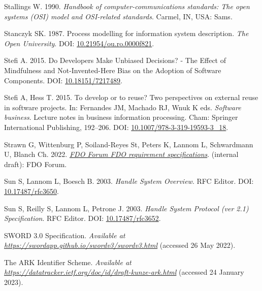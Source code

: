 \begin{CSLReferences}{1}{0}
\leavevmode{}%
Stallings W. 1990. \emph{Handbook of computer-communications standards: The open systems (OSI) model and OSI-related standards}. Carmel, IN, USA: Sams.

\leavevmode{}%
Stanczyk SK. 1987. Process modelling for information system description. \emph{The Open University}. DOI: \href{https://doi.org/10.21954/ou.ro.0000f821}{10.21954/ou.ro.0000f821}.

\leavevmode{}%
Stefi A. 2015. Do Developers Make Unbiased Decisions? - The Effect of Mindfulness and Not-Invented-Here Bias on the Adoption of Software Components. DOI: \href{https://doi.org/10.18151/7217489}{10.18151/7217489}.

\leavevmode{}%
Stefi A, Hess T. 2015. To develop or to reuse? Two perspectives on external reuse in software projects. In: Fernandes JM, Machado RJ, Wnuk K eds. \emph{Software business}. Lecture notes in business information processing. Cham: Springer International Publishing, 192--206. DOI: \href{https://doi.org/10.1007/978-3-319-19593-3_18}{10.1007/978-3-319-19593-3\_18}.

\leavevmode{}%
Strawn G, Wittenburg P, Soiland-Reyes St, Peters K, Lannom L, Schwardmann U, Blanch Ch. 2022. \emph{\href{https://docs.google.com/document/d/1aGA-TBr4XpORhMPtnf_--Nb4FYJccgeSvGmGh68jNws/edit}{FDO Forum FDO requirement specifications}}. (internal draft): FDO Forum.

\leavevmode{}%
Sun S, Lannom L, Boesch B. 2003. \emph{Handle System Overview}. RFC Editor. DOI: \href{https://doi.org/10.17487/rfc3650}{10.17487/rfc3650}.

\leavevmode{}%
Sun S, Reilly S, Lannom L, Petrone J. 2003. \emph{Handle System Protocol (ver 2.1) Specification}. RFC Editor. DOI: \href{https://doi.org/10.17487/rfc3652}{10.17487/rfc3652}.

\leavevmode{}%
SWORD 3.0 Specification. \emph{Available at} \href{https://swordapp.github.io/swordv3/swordv3.html}{\emph{https://swordapp.github.io/swordv3/swordv3.html}} (accessed 26 May 2022).

\leavevmode{}%
The ARK Identifier Scheme. \emph{Available at} \href{https://datatracker.ietf.org/doc/id/draft-kunze-ark.html}{\emph{https://datatracker.ietf.org/doc/id/draft-kunze-ark.html}} (accessed 24 January 2023).


\end{CSLReferences}
